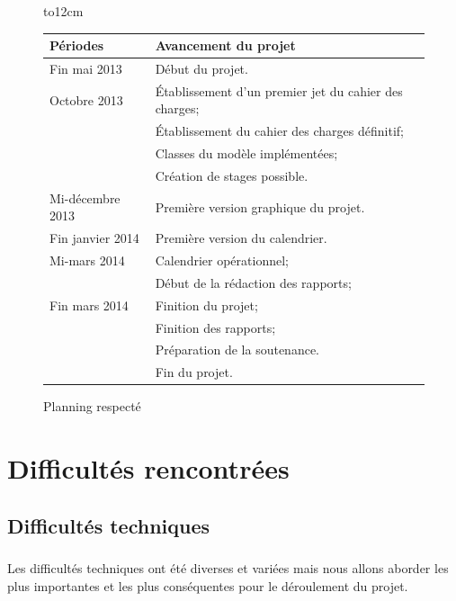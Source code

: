 \documentclass[a4paper,10pt]{report}
\begin{document}
    
    \begin{figure}[H]
	\hbox to12cm{\hss
	\begin{tabular}{|l|l|}
	  \hline
	    \textbf{Périodes} &  \textbf{Avancement du projet}\\
	  \hline
	    Fin mai 2013 & Début du projet.\\
	  \hline
	    Octobre 2013 & Établissement d'un premier jet du cahier des charges;\\
			  & Établissement du cahier des charges définitif;\\
			  & Classes du modèle implémentées;\\
			  & Création de stages possible.\\
	  \hline
	    Mi-décembre 2013 & Première version graphique du projet.\\
	  \hline
	    Fin janvier 2014 & Première version du calendrier.\\
	  \hline
	    Mi-mars 2014 & Calendrier opérationnel;\\
			  & Début de la rédaction des rapports;\\
	  \hline
	    Fin mars 2014 & Finition du projet;\\
			  & Finition des rapports;\\
			  & Préparation de la soutenance.\\
			  & Fin du projet.\\
	  \hline
	\end{tabular}
      \hss}
      \caption{Planning respecté}
    \end{figure}
    



    
    

    
    
  \chapter{Difficultés rencontrées}
    \section{Difficultés techniques}
      \paragraph{}
	Les difficultés techniques ont été diverses et variées mais nous allons aborder les plus importantes et les plus conséquentes pour le déroulement du projet.
      
\end{document}
